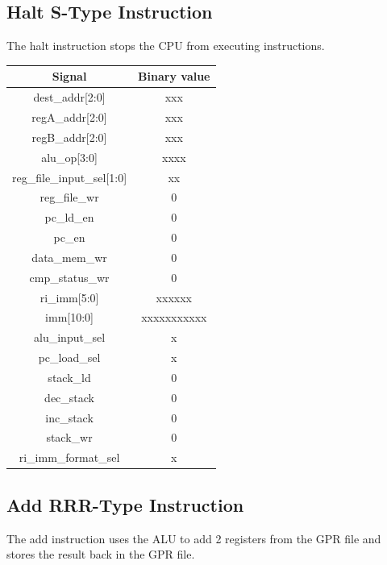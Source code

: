 \documentclass{article}
\begin{document}
\begin{par}
	\newpage
	\subsection{Halt S-Type Instruction}
	
	The halt instruction stops the CPU from executing instructions. \\
	
	\begin{center}
		\begin{tabular}{|c|c|}
			\hline 
			\textbf{Signal} & \textbf{Binary value} \\ 
			\hline 
			dest\_addr[2:0] & xxx \\ 
			\hline 
			regA\_addr[2:0] & xxx \\ 
			\hline 
			regB\_addr[2:0] & xxx \\ 
			\hline 
			alu\_op[3:0] & xxxx \\ 
			\hline 
			reg\_file\_input\_sel[1:0] & xx \\ 
			\hline 
			reg\_file\_wr & 0 \\ 
			\hline 
			pc\_ld\_en & 0 \\ 
			\hline 
			pc\_en & 0 \\ 
			\hline 
			data\_mem\_wr & 0 \\ 
			\hline 
			cmp\_status\_wr & 0 \\ 
			\hline 
			ri\_imm[5:0] & xxxxxx \\ 
			\hline 
			imm[10:0] & xxxxxxxxxxx \\ 
			\hline 
			alu\_input\_sel & x \\ 
			\hline 
			pc\_load\_sel & x \\ 
			\hline 
			stack\_ld & 0 \\ 
			\hline 
			dec\_stack & 0 \\ 
			\hline 
			inc\_stack & 0 \\ 
			\hline 
			stack\_wr & 0 \\ 
			\hline 
			ri\_imm\_format\_sel & x \\ 
			\hline 
		\end{tabular} 
	\end{center}

	\newpage
	\subsection{Add RRR-Type Instruction}
	
	The add instruction uses the ALU to add 2 registers from the GPR file and stores the result back in the GPR file. \\
	

\end{par}
\end{document}
